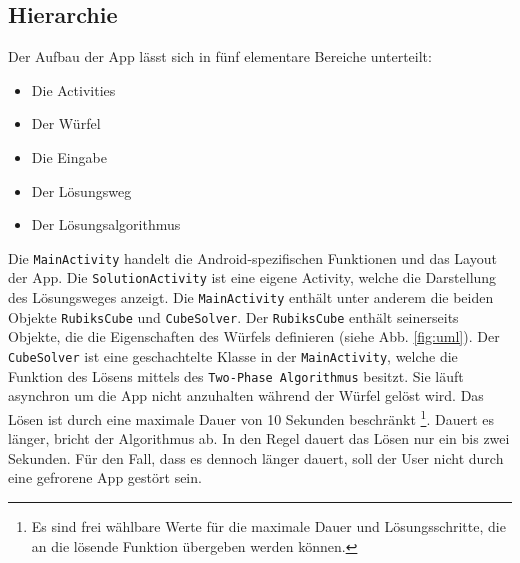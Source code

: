 \subsection{Hierarchie}  %
Der Aufbau der App lässt sich in fünf elementare Bereiche unterteilt:
\begin{itemize}
	\item Die Activities
	\item Der Würfel
	\item Die Eingabe
	\item Der Lösungsweg
	\item Der Lösungsalgorithmus
\end{itemize}
Die \texttt{MainActivity} handelt die Android-spezifischen Funktionen und das Layout der
App. Die \texttt{SolutionActivity} ist eine eigene Activity, welche die Darstellung des
Lösungsweges anzeigt.
Die \texttt{MainActivity} enthält unter anderem die beiden Objekte \texttt{RubiksCube} und \texttt{CubeSolver}.
Der \texttt{RubiksCube} enthält seinerseits Objekte, die die Eigenschaften des Würfels
definieren (siehe Abb. \ref{fig:uml}).
Der \texttt{CubeSolver} ist eine geschachtelte Klasse in der \texttt{MainActivity}, welche die Funktion des Lösens mittels
des \texttt{Two-Phase Algorithmus} besitzt. Sie läuft asynchron um die App nicht anzuhalten
während der Würfel gelöst wird. Das Lösen ist durch eine maximale Dauer von 10 Sekunden beschränkt
\footnote{Es sind frei wählbare Werte für die maximale Dauer und Lösungsschritte, die an die lösende Funktion
übergeben werden können.}.
Dauert es länger, bricht der Algorithmus ab. In den Regel dauert das Lösen nur ein bis zwei Sekunden.
Für den Fall, dass es dennoch länger dauert, soll der User nicht durch eine gefrorene App gestört sein.

